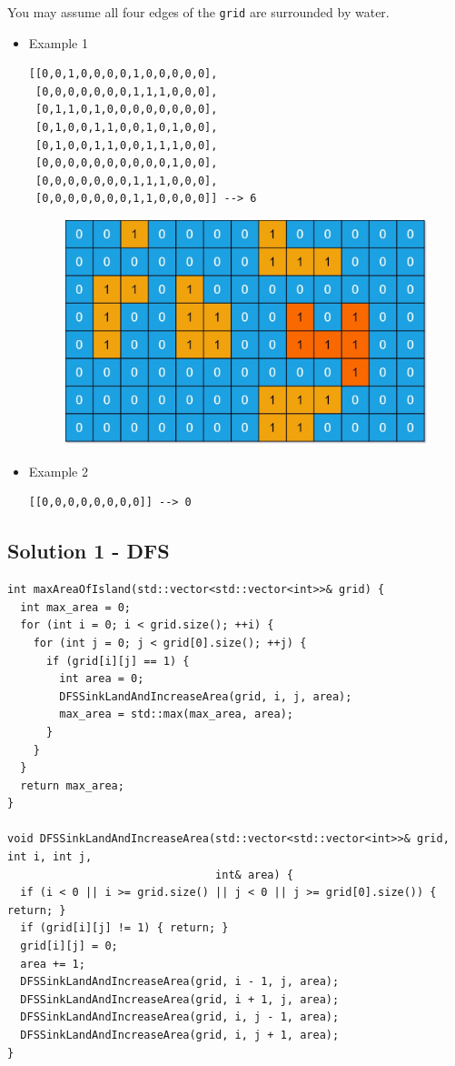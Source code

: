 You may assume all four edges of the {\colorbox{CodeBackground}{\lstinline|grid|}} are surrounded by water.

\begin{itemize}
\item Example 1
\begin{lstlisting}
[[0,0,1,0,0,0,0,1,0,0,0,0,0],
 [0,0,0,0,0,0,0,1,1,1,0,0,0],
 [0,1,1,0,1,0,0,0,0,0,0,0,0],
 [0,1,0,0,1,1,0,0,1,0,1,0,0],
 [0,1,0,0,1,1,0,0,1,1,1,0,0],
 [0,0,0,0,0,0,0,0,0,0,1,0,0],
 [0,0,0,0,0,0,0,1,1,1,0,0,0],
 [0,0,0,0,0,0,0,1,1,0,0,0,0]] --> 6
\end{lstlisting}
\begin{figure}[H]
\centering
\includegraphics[width=0.6\linewidth]{images/lc0695_example}
\label{fig:lc0695example}
\end{figure}
\item Example 2
\begin{lstlisting}
[[0,0,0,0,0,0,0,0]] --> 0
\end{lstlisting}
\end{itemize}

\subsection*{Solution 1 - DFS}
\begin{lstlisting}
int maxAreaOfIsland(std::vector<std::vector<int>>& grid) {
  int max_area = 0;
  for (int i = 0; i < grid.size(); ++i) {
    for (int j = 0; j < grid[0].size(); ++j) {
      if (grid[i][j] == 1) {
        int area = 0;
        DFSSinkLandAndIncreaseArea(grid, i, j, area);
        max_area = std::max(max_area, area);
      }
    }
  }
  return max_area;
}

void DFSSinkLandAndIncreaseArea(std::vector<std::vector<int>>& grid, int i, int j,
                                int& area) {
  if (i < 0 || i >= grid.size() || j < 0 || j >= grid[0].size()) { return; }
  if (grid[i][j] != 1) { return; }
  grid[i][j] = 0;
  area += 1;
  DFSSinkLandAndIncreaseArea(grid, i - 1, j, area);
  DFSSinkLandAndIncreaseArea(grid, i + 1, j, area);
  DFSSinkLandAndIncreaseArea(grid, i, j - 1, area);
  DFSSinkLandAndIncreaseArea(grid, i, j + 1, area);
}
\end{lstlisting}

